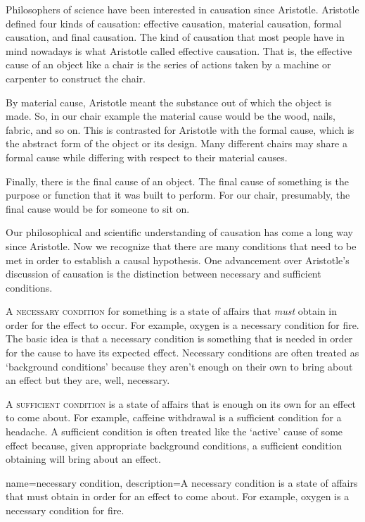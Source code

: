 Philosophers of science have been interested in causation since Aristotle. Aristotle defined four kinds of causation: effective causation, material causation, formal causation, and final causation. The kind of causation that most people have in mind nowadays is what Aristotle called effective causation. That is, the effective cause of an object like a chair is the series of actions taken by a machine or carpenter to construct the chair.

By material cause, Aristotle meant the substance out of which the object is made. So, in our chair example the material cause would be the wood, nails, fabric, and so on. This is contrasted for Aristotle with the formal cause, which is the abstract form of the object or its design. Many different chairs may share a formal cause while differing with respect to their material causes.

Finally, there is the final cause of an object. The final cause of something is the purpose or function that it was built to perform. For our chair, presumably, the final cause would be for someone to sit on.

Our philosophical and scientific understanding of causation has come a long way since Aristotle. Now we recognize that there are many conditions that need to be met in order to establish a causal hypothesis. One advancement over Aristotle's discussion of causation is the distinction between necessary and sufficient conditions.

A \textsc{\gls{necessary condition}} for something is a state of affairs that \emph{must} obtain in order for the effect to occur. For example, oxygen is a necessary condition for fire. The basic idea is that a necessary condition is something that is needed in order for the cause to have its expected effect. Necessary conditions are often treated as `background conditions' because they aren't enough on their own to bring about an effect but they are, well, necessary.

A \textsc{\gls{sufficient condition}} is a state of affairs that is enough on its own for an effect to come about. For example, caffeine withdrawal is a sufficient condition for a headache. A sufficient condition is often treated like the `active' cause of some effect because, given appropriate background conditions, a sufficient condition obtaining will bring about an effect.

{
name=necessary condition,
description={A necessary condition is a state of affairs that must obtain in order for an effect to come about. For example, oxygen is a necessary condition for fire.}
}

